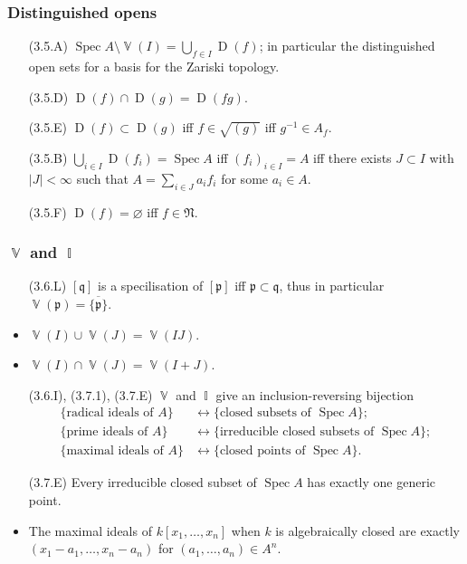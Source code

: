\documentclass[10pt]{article}
\DeclareMathOperator{\Spec}{Spec}
\DeclareMathOperator{\V}{\mathbb{V}}
\DeclareMathOperator{\I}{\mathbb{I}}
\DeclareMathOperator{\D}{D}
\newcommand{\prid}{\mathfrak{p}}
\newcommand{\nilr}{\mathfrak{N}}
\begin{document}
            \subsubsection{Distinguished opens}
            
                \begin{itemize}
                    \item[(3.5.A)] $\Spec A\setminus\V(I)=\bigcup_{f\in I}\D(f)$; in particular the distinguished open sets for a basis for the Zariski topology.
                    \item[(3.5.D)] $\D(f)\cap\D(g)=\D(fg)$.
                    \item[(3.5.E)] $\D(f)\subset\D(g)$ iff $f\in\sqrt{(g)}$ iff $g^{-1}\in A_f$.
                    \item[(3.5.B)] $\bigcup_{i\in I}\D(f_i)=\Spec A$ iff $(f_i)_{i\in I}= A$ iff there exists $J\subset I$ with $|J|<\infty$ such that $A=\sum_{i\in J}a_if_i$ for some $a_i\in A$.
                    \item[(3.5.F)] $\D(f)=\varnothing$ iff $f\in\nilr$.
                \end{itemize}
                
            \subsubsection{$\V$ and $\I$}\label{subsubsection:v-and-i}
            
                \begin{itemize}
                    \item[(3.6.L)] $[\mathfrak{q}]$ is a specilisation of $[\prid]$ iff $\prid\subset\mathfrak{q}$, thus in particular $\V(\prid)=\overline{\{\prid\}}$.
                    \item $\V(I)\cup\V(J)=\V(IJ)$.
                    \item $\V(I)\cap\V(J)=\V(I+J)$.
                    \item[(3.6.I), (3.7.1), (3.7.E)] $\V$ and $\I$ give an inclusion-reversing bijection
                        \begin{align*}
                            \{\text{radical ideals of }A\} &\leftrightarrow \{\text{closed subsets of }\Spec A\};\\
                            \{\text{prime ideals of }A\} &\leftrightarrow \{\text{irreducible closed subsets of }\Spec A\};\\
                            \{\text{maximal ideals of }A\} &\leftrightarrow \{\text{closed points of }\Spec A\}.
                        \end{align*}
                    \item[(3.7.E)] Every irreducible closed subset of $\Spec A$ has exactly one generic point.
                    \item The maximal ideals of $k[x_1,\ldots,x_n]$ when $k$ is algebraically closed are exactly $(x_1-a_1,\ldots,x_n-a_n)$ for $(a_1,\ldots,a_n)\in A^n$.
                \end{itemize}
            
\end{document}
